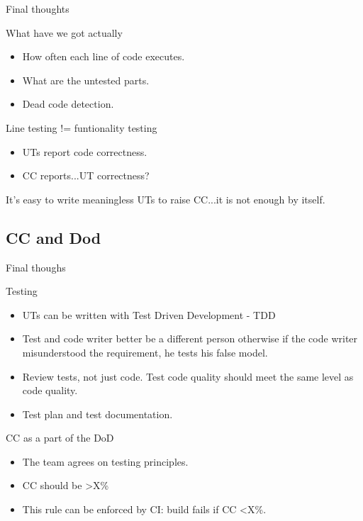 \documentclass{beamer}
\begin{document}
\begin{frame}{Final thoughts}

\begin{block}{What have we got actually}
\small
\begin{itemize}
  \item How often each line of code executes.
  \item What are the untested parts.
  \item Dead code detection.
\end{itemize}
\end{block}

\begin{block}{Line testing != funtionality testing}
\small
\begin{itemize}
  \item UTs report code correctness.
  \item CC reports...UT correctness?
\end{itemize}
It's easy to write meaningless UTs to raise CC...it is not enough by itself.
\end{block}

\end{frame}


\subsection{CC and Dod}

\begin{frame}{Final thoughs}

\begin{block}{Testing}
\small

\begin{itemize}
  \item UTs can be written with Test Driven Development - TDD \cite{tdd}
  \item Test and code writer better be a different person otherwise if the code writer misunderstood the requirement, he tests his false model.
  \item Review tests, not just code. Test code quality should meet the same level as code quality.
  \item Test plan and test documentation.
\end{itemize}
\end{block}

\begin{block}{CC as a part of the DoD}
\small

\begin{itemize}
  \item The team agrees on testing principles.
  \item CC should be \textgreater X\%  
  \item This rule can be enforced by CI: build fails if CC \textless X\%.
\end{itemize}
\end{block}

\end{frame}
\end{document}
